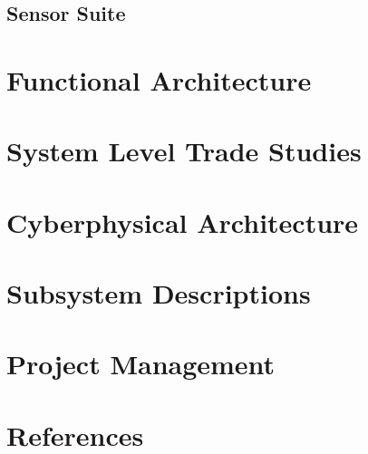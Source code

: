 \documentclass{article}
\begin{document}
\subsection{Sensor Suite}

\section{Functional Architecture}

\section{System Level Trade Studies}

\section{Cyberphysical Architecture}

\section{Subsystem Descriptions}

\section{Project Management}

\section{References}
\end{document}
